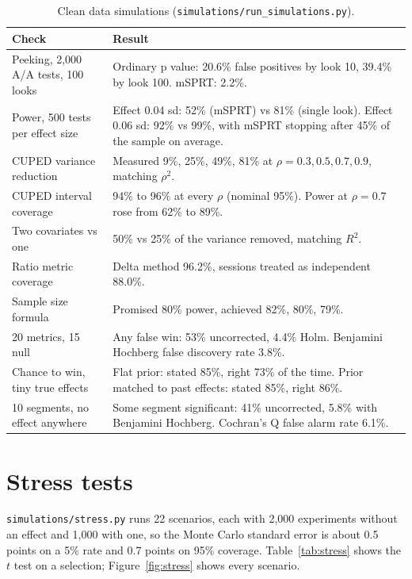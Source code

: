 \documentclass[10pt]{article}
\begin{document}
\begin{table}[!tb]
\centering\small
\begin{tabular}{p{4.6cm}p{9.6cm}}
\toprule
Check & Result \\
\midrule
Peeking, 2{,}000 A/A tests, 100 looks & Ordinary p value: 20.6\% false positives by look 10, 39.4\% by look 100. mSPRT: 2.2\%. \\
Power, 500 tests per effect size & Effect 0.04 sd: 52\% (mSPRT) vs 81\% (single look). Effect 0.06 sd: 92\% vs 99\%, with mSPRT stopping after 45\% of the sample on average. \\
CUPED variance reduction & Measured 9\%, 25\%, 49\%, 81\% at $\rho = 0.3, 0.5, 0.7, 0.9$, matching $\rho^2$. \\
CUPED interval coverage & 94\% to 96\% at every $\rho$ (nominal 95\%). Power at $\rho = 0.7$ rose from 62\% to 89\%. \\
Two covariates vs one & 50\% vs 25\% of the variance removed, matching $R^2$. \\
Ratio metric coverage & Delta method 96.2\%, sessions treated as independent 88.0\%. \\
Sample size formula & Promised 80\% power, achieved 82\%, 80\%, 79\%. \\
20 metrics, 15 null & Any false win: 53\% uncorrected, 4.4\% Holm. Benjamini Hochberg false discovery rate 3.8\%. \\
Chance to win, tiny true effects & Flat prior: stated 85\%, right 73\% of the time. Prior matched to past effects: stated 85\%, right 86\%. \\
10 segments, no effect anywhere & Some segment significant: 41\% uncorrected, 5.8\% with Benjamini Hochberg. Cochran's Q false alarm rate 6.1\%. \\
\bottomrule
\end{tabular}
\caption{Clean data simulations (\texttt{simulations/run\_simulations.py}).}
\label{tab:sim}
\end{table}

\section{Stress tests}\label{sec:stress}
\texttt{simulations/stress.py} runs 22 scenarios, each with 2,000 experiments without an effect and 1,000 with one, so the Monte Carlo standard error is about 0.5 points on a 5\% rate and 0.7 points on 95\% coverage. Table~\ref{tab:stress} shows the $t$ test on a selection; Figure~\ref{fig:stress} shows every scenario.
\end{document}
